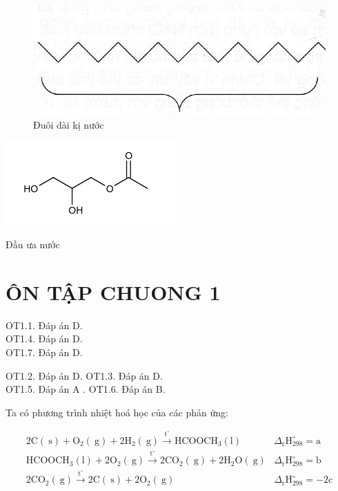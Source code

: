 \documentclass[10pt]{article}
\begin{document}
\begin{figure}[h]
\begin{center}
  \includegraphics[width=\textwidth]{2025_10_23_b4e16b74380d0f7e7700g-013(1)}
\captionsetup{labelformat=empty}
\caption{Đuôi dài kị nước}
\end{center}
\end{figure}

\includegraphics{smile-f69f5025ca38680a2e5e34a5b4a069e29f561f3b}

Đầu ưa nước

\section*{ÔN TẬP CHUONG 1}
OT1.1. Đáp án D.\\
OT1.4. Đáp án D.\\
OT1.7. Đáp án D.

OT1.2. Đáp án D. OT1.3. Đáp án D.\\
OT1.5. Đáp án A . OT1.6. Đáp án B.

Ta có phương trình nhiệt hoá học của các phản ứng:

$$
\begin{array}{ll}
2 \mathrm{C}(\mathrm{~s})+\mathrm{O}_{2}(\mathrm{~g})+2 \mathrm{H}_{2}(\mathrm{~g}) \xrightarrow{\mathrm{t}^{\circ}} \mathrm{HCOOCH}_{3}(\mathrm{l}) & \Delta_{\mathrm{r}} \mathrm{H}_{298}^{\circ}=\mathrm{a} \\
\mathrm{HCOOCH}_{3}(\mathrm{l})+2 \mathrm{O}_{2}(\mathrm{~g}) \xrightarrow{\mathrm{t}^{\circ}} 2 \mathrm{CO}_{2}(\mathrm{~g})+2 \mathrm{H}_{2} \mathrm{O}(\mathrm{~g}) & \Delta_{\mathrm{r}} \mathrm{H}_{298}^{\circ}=\mathrm{b} \\
2 \mathrm{CO}_{2}(\mathrm{~g}) \xrightarrow{\mathrm{t}^{\circ}} 2 \mathrm{C}(\mathrm{~s})+2 \mathrm{O}_{2}(\mathrm{~g}) & \Delta_{\mathrm{r}} \mathrm{H}_{298}^{\circ}=-2 \mathrm{c}
\end{array}
$$
\end{document}
